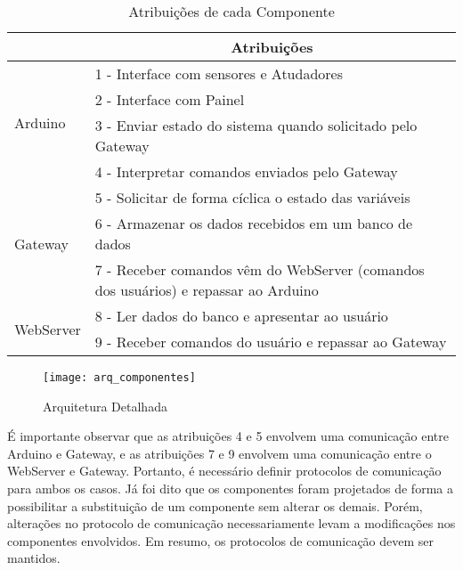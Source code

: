 			\begin{table}[!htb]
				\centering
				\captionsetup{justification=centering}
				\caption[Atribuições de cada Componente]{Atribuições de cada Componente}
				\label{tbl4}
				\def\arraystretch{1.5}
				\begin{tabular}{m{2cm}| p{12cm}}
					& \multicolumn{1}{c}{\textbf{Atribuições}} \\ \hline
					
					\multirow{4}{*}{Arduino} 
					& 1 - Interface com sensores e Atudadores \\
					& 2 - Interface com Painel \\
					& 3 - Enviar estado do sistema quando solicitado pelo Gateway\\
					& 4 - Interpretar comandos enviados pelo Gateway \\ \hline
					
					\multirow{3}{*}{Gateway} & 5 - Solicitar de forma cíclica o estado das variáveis \\
					& 6 - Armazenar os dados recebidos em um banco de dados \\
					& 7 - Receber comandos vêm do WebServer (comandos dos usuários) e repassar ao Arduino \\ \hline
					
					\multirow{2}{*}{WebServer} & 8 - Ler dados do banco e apresentar ao usuário \\
					& 9 - Receber comandos do usuário e repassar ao Gateway \\
						
					\hline
				\end{tabular}
			\end{table}
			
			\begin{figure}[!htb]	
				\captionsetup{justification=centering}
				\begin{center}
					\texttt{[image: arq\_componentes]}  %
					\caption[Arquitetura Detalhada]{\label{fig:arq_componentes} Arquitetura Detalhada }
				\end{center}		
			\end{figure}
		
			É importante observar que as atribuições 4 e 5 envolvem uma comunicação entre Arduino e Gateway, e as atribuições 7 e 9 envolvem uma comunicação entre o WebServer e Gateway. Portanto, é necessário definir protocolos de comunicação para ambos os casos. Já foi dito que os componentes foram projetados de forma a possibilitar a substituição de um componente sem alterar os demais. Porém, alterações no protocolo de comunicação necessariamente levam a modificações nos componentes envolvidos. Em resumo, os protocolos de comunicação devem ser mantidos.
			
